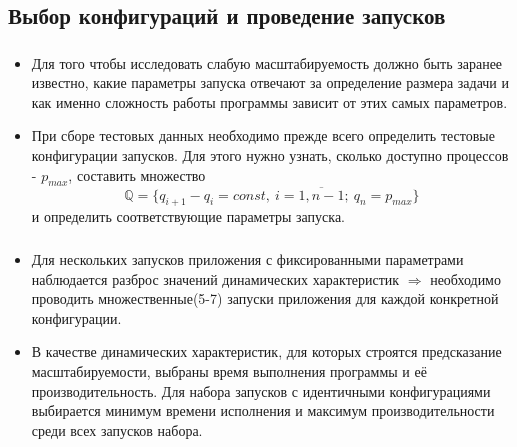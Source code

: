 \documentclass[unicode, t, 11pt]{beamer}%
\begin{document}
		\subsection{Выбор конфигураций и проведение запусков}
			\begin{frame}
				\frametitle{\insertsection}
	 			\framesubtitle{\insertsubsection}
	 			\begin{itemize}[label=\(\bullet\)]
					\item Для того чтобы исследовать слабую масштабируемость должно быть заранее известно, какие параметры запуска отвечают за определение размера задачи и как именно сложность работы программы зависит от этих самых параметров.
					\item При сборе тестовых данных необходимо прежде всего определить тестовые конфигурации запусков. Для этого нужно узнать, сколько доступно процессов - \(p_{max}\), составить множество \[\mathbb{Q} = \{q_{i + 1} - q_{i} = const,\ i = \overline{1,n - 1};\ q_n = p_{max}\}\] и определить соответствующие параметры запуска.
				\end{itemize}
			\end{frame}
			\begin{frame}
				\frametitle{\insertsection}
	 			\framesubtitle{\insertsubsection}
	 			\begin{itemize}[label=\(\bullet\)]
					\item Для нескольких запусков приложения с фиксированными параметрами наблюдается разброс значений динамических характеристик \(\Rightarrow\) необходимо проводить множественные(5-7) запуски приложения для каждой конкретной конфигурации.
					\item В качестве динамических характеристик, для которых строятся предсказание масштабируемости, выбраны время выполнения программы и её производительность. Для набора запусков с идентичными конфигурациями выбирается минимум времени исполнения и максимум производительности среди всех запусков набора.
				\end{itemize}
			\end{frame}
\end{document}
